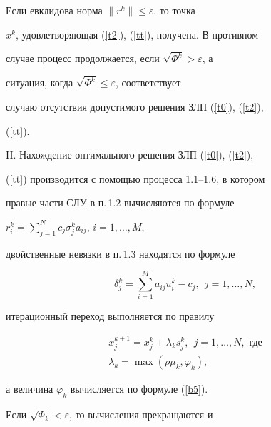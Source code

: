 Если евклидова норма $\| r^{k}\| \leq \varepsilon$, то точка


$x^k$, удовлетворяющая (\ref{t2}), (\ref{tt}), получена. В противном


случае процесс продолжается, если $\sqrt{\Phi^k}>\varepsilon$, а


ситуация, когда $\sqrt{\Phi^k}\leq\varepsilon$, соответствует


случаю отсутствия допустимого решения ЗЛП (\ref{t0}), (\ref{t2}),


(\ref{tt}).





II. Нахождение оптимального решения ЗЛП (\ref{t0}), (\ref{t2}),


(\ref{tt}) производится с помощью процесса 1.1--1.6, в котором





правые части СЛУ в п.\,1.2 вычисляются по формуле


$r^{k}_{i}=\sum\limits_{j=1}^Nc_j\sigma_j^ka_{ij}$, $i = 1,\dotsc,M$,





двойственные невязки в п.\,1.3 находятся по формуле


$$


\delta^{k}_{j}=\sum\limits_{i=1}^Ma_{ij}u^{k}_{i} - c_j,


\ \ j = 1,\dotsc,N,


$$





итерационный переход выполняется по правилу


\begin{gather*}


x_{j}^{k+1}=x_{j}^{k}+\lambda_{k}s_{j}^{k},


\ \ j=1,\dotsc,N, \text{ где} \\


\lambda_{k}= \max(\rho\mu_k,\varphi_k),


\end{gather*}





а величина $\varphi_k$ вычисляется по формуле (\ref{b5}).





Если $\sqrt{\Phi_k} < \varepsilon$, то вычисления прекращаются и


